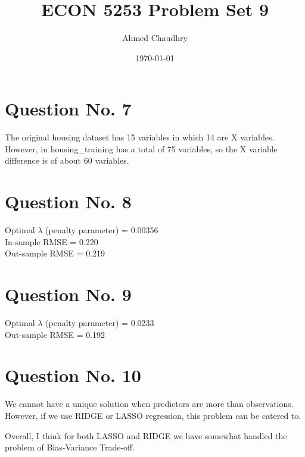 \documentclass{article}
\title{ECON 5253 Problem Set 9}
\author{Ahmed Chaudhry}
\date{\today}
\begin{document}
\maketitle

\section{Question No. 7}
The original housing dataset has 15 variables in which 14 are X variables. However, in housing\_training has a total of 75 variables, so the X variable difference is of about 60 variables.

\section{Question No. 8}
Optimal $\lambda$ (penalty parameter) = 0.00356\\
In-sample RMSE = 0.220 \\
Out-sample RMSE = 0.219 \\

\section{Question No. 9}
Optimal $\lambda$ (penalty parameter) = 0.0233\\
Out-sample RMSE = 0.192 \\

\section{Question No. 10}
We cannot have a unique solution when predictors are more than observations. However, if we use RIDGE or LASSO regression, this problem can be catered to.

Overall, I think for both LASSO and RIDGE we have somewhat handled the problem of Bias-Variance Trade-off.
\end{document}
